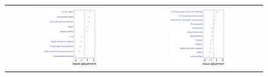 \begin{figure}
  \center
  \begin{tabular}{cc}
    \includegraphics[width=0.5\textwidth]{chapter_spatial_voting_with_text/figures/3393_house_Ronald_Paul_400311.pdf} &
    \includegraphics[width=0.5\textwidth]{chapter_spatial_voting_with_text/figures/3393_house_Donald_Young_400440.pdf} \\

\end{tabular}
\end{figure}
